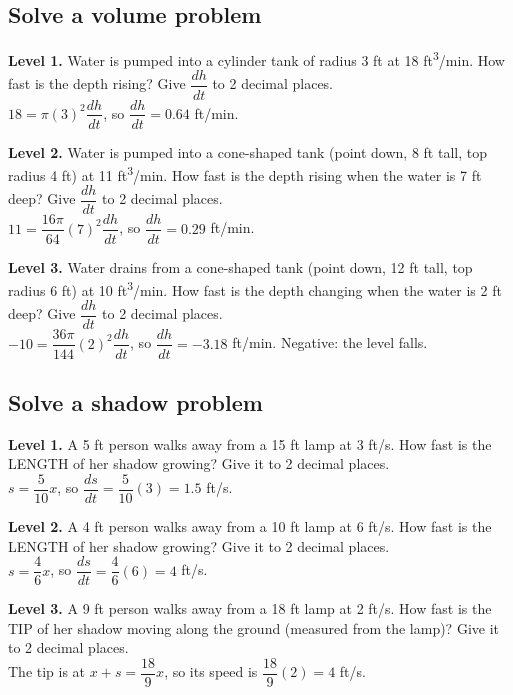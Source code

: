 \documentclass[11pt]{article}
\begin{document}
\subsection*{Solve a volume problem}
\noindent\textbf{Level 1.} Water is pumped into a cylinder tank of radius 3 ft at 18 ft\textsuperscript{3}/min. How fast is the depth rising? Give $\dfrac{dh}{dt}$ to 2 decimal places.\\  \quad $18=\pi(3)^2\dfrac{dh}{dt}$, so $\dfrac{dh}{dt}=0.64$ ft/min.\par\medskip
\noindent\textbf{Level 2.} Water is pumped into a cone-shaped tank (point down, 8 ft tall, top radius 4 ft) at 11 ft\textsuperscript{3}/min. How fast is the depth rising when the water is 7 ft deep? Give $\dfrac{dh}{dt}$ to 2 decimal places.\\  \quad $11=\dfrac{16\pi}{64}(7)^2\dfrac{dh}{dt}$, so $\dfrac{dh}{dt}=0.29$ ft/min.\par\medskip
\noindent\textbf{Level 3.} Water drains from a cone-shaped tank (point down, 12 ft tall, top radius 6 ft) at 10 ft\textsuperscript{3}/min. How fast is the depth changing when the water is 2 ft deep? Give $\dfrac{dh}{dt}$ to 2 decimal places.\\  \quad $-10=\dfrac{36\pi}{144}(2)^2\dfrac{dh}{dt}$, so $\dfrac{dh}{dt}=-3.18$ ft/min. Negative: the level falls.\par\medskip
\subsection*{Solve a shadow problem}
\noindent\textbf{Level 1.} A 5 ft person walks away from a 15 ft lamp at 3 ft/s. How fast is the LENGTH of her shadow growing? Give it to 2 decimal places.\\  \quad $s=\dfrac{5}{10}x$, so $\dfrac{ds}{dt}=\dfrac{5}{10}(3)=1.5$ ft/s.\par\medskip
\noindent\textbf{Level 2.} A 4 ft person walks away from a 10 ft lamp at 6 ft/s. How fast is the LENGTH of her shadow growing? Give it to 2 decimal places.\\  \quad $s=\dfrac{4}{6}x$, so $\dfrac{ds}{dt}=\dfrac{4}{6}(6)=4$ ft/s.\par\medskip
\noindent\textbf{Level 3.} A 9 ft person walks away from a 18 ft lamp at 2 ft/s. How fast is the TIP of her shadow moving along the ground (measured from the lamp)? Give it to 2 decimal places.\\  \quad The tip is at $x+s=\dfrac{18}{9}x$, so its speed is $\dfrac{18}{9}(2)=4$ ft/s.\par\medskip
\end{document}
